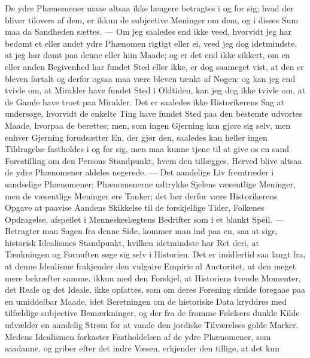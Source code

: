 \documentclass[12pt]{book}
\newcommand{\opage}[1]{\marginnote{\footnotesize\textit{[#1]}}}
\begin{document}
De ydre Phænomener maae altsaa ikke længere betragtes i og for sig; hvad der
bliver tilovers af dem, er ikkun de subjective Meninger om dem, og i disses Sum
maa da Sandheden sættes. --- Om jeg saaledes end ikke veed, hvorvidt jeg har
bedømt et eller andet ydre Phænomen rigtigt eller ei, veed jeg dog idetmindste,
at jeg har dømt paa denne eller hiin Maade; og er det end ikke sikkert, om en
eller anden Begivenhed har fundet Sted eller ikke, er dog saameget vist, at den
er bleven fortalt og derfor ogsaa maa være bleven tænkt af Nogen; og kan jeg end
tvivle om, at Mirakler have fundet Sted i Oldtiden, kan jeg dog ikke tvivle om,
at de Gamle have troet paa Mirakler. Det er saaledes ikke Historikerens Sag at
undersøge, hvorvidt de enkelte Ting have fundet Sted paa den bestemte udvortes
Maade, hvorpaa de berettes; men, som ingen Gjerning kan gjøre sig selv, men
enhver Gjerning forudsætter En, der gjør den, saaledes kan heller ingen
Tildragelse fastholdes i og for sig, men maa kunne tjene til at give os en sand
Forestilling om den Persons Standpunkt, hvem den tillægges. Herved blive altsaa
de ydre Phænomener aldeles negerede. --- Det aandelige Liv fremtræder i
sandselige Phænomener; Phænomenerne udtrykke Sjelens væsentlige Meninger, men de
væsentlige Meninger ere Tanker; det bør derfor være Historikerens Opgave at
paavise Aandens Skikkelse til de forskjellige Tider, Folkenes Opdragelse,
afspeilet i Menneskeslægtens Bedrifter som i et blankt Speil. --- Betragter man
Sagen fra denne Side, kommer man ind paa en, saa at sige, historisk Idealismes
Standpunkt, hvilken idetmindste har Ret deri, at Tænkningen og Fornuften søge
sig selv i Historien. Det er imidlertid saa%
\opage{19}\setcounter{footnote}{0}%
langt fra, at denne Idealisme frakjender den vulgaire Empirie al Auctoritet, at
den meget mere bekræfter samme, ikkun med den Forskjel, at Historiens tvende
Momenter, det Reale og det Ideale, ikke opfattes, som om deres Forening skulde
foregaae paa en umiddelbar Maade, idet Beretningen om de historiske Data
kryddres med tilfældige subjective Bemærkninger, og der fra de fromme Følelsers
dunkle Kilde udvælder en aandelig Strøm for at vande den jordiske Tilværelses
golde Marker. Medens Idealismen forkaster Fastholdelsen af de ydre Phænomener,
som saadanne, og griber efter det indre Væsen, erkjender den tillige, at det kun
\end{document}
